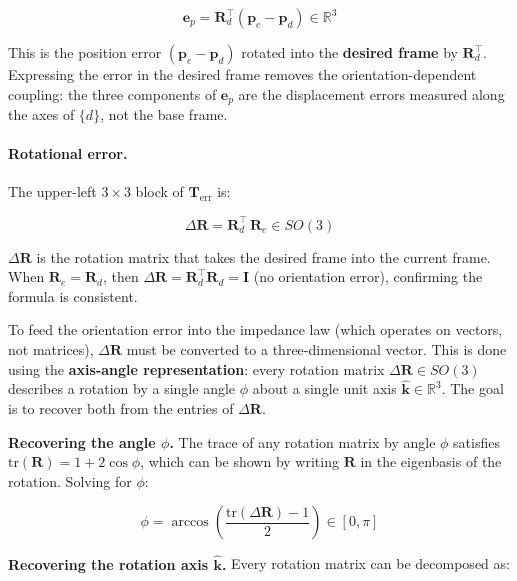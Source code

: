 \begin{equation}
\label{eq:pos_error}
\mathbf{e}_p
= \mathbf{R}_d^\top(\mathbf{p}_e - \mathbf{p}_d)
\in\mathbb{R}^3
\end{equation}

This is the position error $(\mathbf{p}_e-\mathbf{p}_d)$ rotated
into the \textbf{desired frame} by $\mathbf{R}_d^\top$.
Expressing the error in the desired frame removes the
orientation-dependent coupling: the three components of $\mathbf{e}_p$
are the displacement errors measured along the axes of $\{d\}$, not
the base frame.

\paragraph{Rotational error.}
The upper-left $3\times3$ block of $\mathbf{T}_{\mathrm{err}}$ is:

\begin{equation}
\label{eq:R_error}
\Delta\mathbf{R} = \mathbf{R}_d^\top\,\mathbf{R}_e \in SO(3)
\end{equation}

$\Delta\mathbf{R}$ is the rotation matrix that takes the desired frame
into the current frame.
When $\mathbf{R}_e = \mathbf{R}_d$, then
$\Delta\mathbf{R}=\mathbf{R}_d^\top\mathbf{R}_d=\mathbf{I}$ (no
orientation error), confirming the formula is consistent.

To feed the orientation error into the impedance law (which operates
on vectors, not matrices), $\Delta\mathbf{R}$ must be converted to a
three-dimensional vector.
This is done using the \textbf{axis-angle representation}: every rotation
matrix $\Delta\mathbf{R}\in SO(3)$ describes a rotation by a single
angle $\phi$ about a single unit axis $\hat{\mathbf{k}}\in\mathbb{R}^3$.
The goal is to recover both from the entries of $\Delta\mathbf{R}$.

\smallskip
\noindent\textbf{Recovering the angle $\phi$.}
The trace of any rotation matrix by angle $\phi$ satisfies
$\mathrm{tr}(\mathbf{R})=1+2\cos\phi$, which can be shown by writing
$\mathbf{R}$ in the eigenbasis of the rotation.
Solving for $\phi$:

\begin{equation}
\label{eq:phi}
\phi = \arccos\!\left(\frac{\mathrm{tr}(\Delta\mathbf{R})-1}{2}\right)
\in [0,\pi]
\end{equation}

\smallskip
\noindent\textbf{Recovering the rotation axis $\hat{\mathbf{k}}$.}
Every rotation matrix can be decomposed as:

